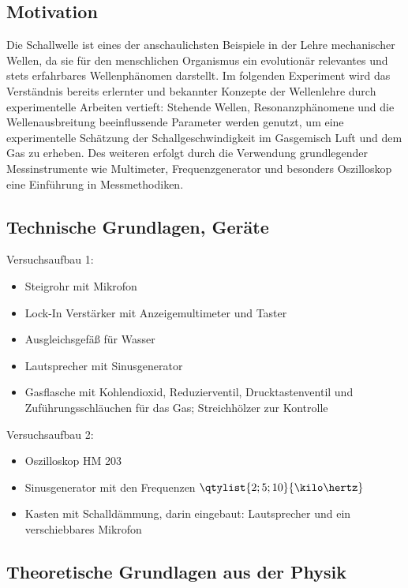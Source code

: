 \subsection{Motivation}
Die Schallwelle ist eines der anschaulichsten Beispiele in der Lehre mechanischer Wellen, da sie für den menschlichen Organismus ein evolutionär relevantes und stets erfahrbares Wellenphänomen darstellt. Im folgenden Experiment wird das Verständnis bereits erlernter und bekannter Konzepte der Wellenlehre durch experimentelle Arbeiten vertieft: Stehende Wellen, Resonanzphänomene und die Wellenausbreitung beeinflussende Parameter werden genutzt, um eine experimentelle Schätzung der Schallgeschwindigkeit im Gasgemisch Luft und dem Gas  zu erheben. Des weiteren erfolgt durch die Verwendung grundlegender Messinstrumente wie Multimeter, Frequenzgenerator und besonders Oszilloskop eine Einführung in Messmethodiken.

\subsection{Technische Grundlagen, Geräte}
Versuchsaufbau 1:
\begin{itemize}
    \item Steigrohr mit Mikrofon
    \item Lock-In Verstärker mit Anzeigemultimeter und Taster
    \item Ausgleichsgefäß für Wasser
    \item Lautsprecher mit Sinusgenerator
    \item Gasflasche mit Kohlendioxid, Reduzierventil, Drucktastenventil und Zuführungsschläuchen für das Gas; Streichhölzer zur Kontrolle
\end{itemize}
Versuchsaufbau 2:
\begin{itemize}
    \item Oszilloskop HM 203
    \item Sinusgenerator mit den Frequenzen \(\qtylist{2;5;10}{\kilo\hertz}\)
    \item Kasten mit Schalldämmung, darin eingebaut: Lautsprecher und ein verschiebbares Mikrofon
\end{itemize}


\subsection[Theoretische Grundlagen aus der Physik]{Theoretische Grundlagen aus der Physik \autocite{Skript_1}}
